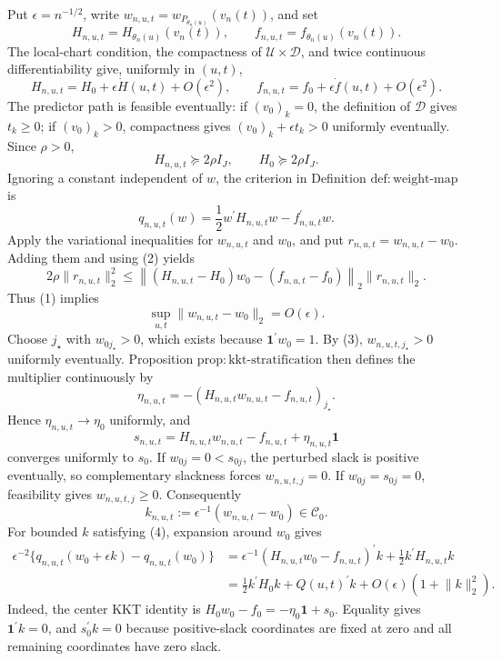 Put \(\epsilon=n^{-1/2}\), write \(w_{n,u,t}=w_{P_{\theta_n(u)}}(v_n(t))\), and set
\[
 H_{n,u,t}=H_{\theta_n(u)}(v_n(t)),\qquad
 f_{n,u,t}=f_{\theta_n(u)}(v_n(t)).
\]
The local-chart condition, the compactness of \(\mathcal U\times\mathcal D\), and twice continuous differentiability give, uniformly in \((u,t)\),
\[
 H_{n,u,t}=H_0+\epsilon\dot H(u,t)+O(\epsilon^2),
 \qquad
 f_{n,u,t}=f_0+\epsilon\dot f(u,t)+O(\epsilon^2).
\tag{1}
\]
The predictor path is feasible eventually: if \((v_0)_k=0\), the definition of \(\mathcal D\) gives \(t_k\geq0\); if \((v_0)_k>0\), compactness gives \((v_0)_k+\epsilon t_k>0\) uniformly eventually.  Since \(\rho>0\),
\[
 H_{n,u,t}\succeq 2\rho I_J,\qquad H_0\succeq2\rho I_J.
\tag{2}
\]
Ignoring a constant independent of \(w\), the criterion in Definition \(\mathrm{def:weight\mbox{-}map}\) is
\[
 q_{n,u,t}(w)=\frac12w^\prime H_{n,u,t}w-f_{n,u,t}^\prime w.
\]
Apply the variational inequalities for \(w_{n,u,t}\) and \(w_0\), and put \(r_{n,u,t}=w_{n,u,t}-w_0\).  Adding them and using (2) yields
\[
 2\rho\lVert r_{n,u,t}\rVert_2^2
 \leq
 \left\lVert (H_{n,u,t}-H_0)w_0-(f_{n,u,t}-f_0)\right\rVert_2
 \lVert r_{n,u,t}\rVert_2.
\]
Thus (1) implies
\[
 \sup_{u,t}\lVert w_{n,u,t}-w_0\rVert_2=O(\epsilon).
\tag{3}
\]
Choose \(j_\star\) with \(w_{0j_\star}>0\), which exists because \(\mathbf1^\prime w_0=1\).  By (3), \(w_{n,u,t,j_\star}>0\) uniformly eventually.  Proposition \(\mathrm{prop:kkt\mbox{-}stratification}\) then defines the multiplier continuously by
\[
 \eta_{n,u,t}=-(H_{n,u,t}w_{n,u,t}-f_{n,u,t})_{j_\star}.
\]
Hence \(\eta_{n,u,t}\to\eta_0\) uniformly, and
\[
 s_{n,u,t}=H_{n,u,t}w_{n,u,t}-f_{n,u,t}+\eta_{n,u,t}\mathbf1
\]
converges uniformly to \(s_0\).  If \(w_{0j}=0<s_{0j}\), the perturbed slack is positive eventually, so complementary slackness forces \(w_{n,u,t,j}=0\).  If \(w_{0j}=s_{0j}=0\), feasibility gives \(w_{n,u,t,j}\geq0\).  Consequently
\[
 k_{n,u,t}:=\epsilon^{-1}(w_{n,u,t}-w_0)\in\mathcal C_0.
\tag{4}
\]
For bounded \(k\) satisfying (4), expansion around \(w_0\) gives
\[
\begin{aligned}
 \epsilon^{-2}\{q_{n,u,t}(w_0+\epsilon k)-q_{n,u,t}(w_0)\}
 &=
 \epsilon^{-1}(H_{n,u,t}w_0-f_{n,u,t})^\prime k
 +\frac12k^\prime H_{n,u,t}k\\
 &=
 \frac12k^\prime H_0k+Q(u,t)^\prime k
 +O(\epsilon)(1+\lVert k\rVert_2^2).
\end{aligned}
\tag{5}
\]
Indeed, the center KKT identity is \(H_0w_0-f_0=-\eta_0\mathbf1+s_0\).  Equality gives \(\mathbf1^\prime k=0\), and \(s_0^\prime k=0\) because positive-slack coordinates are fixed at zero and all remaining coordinates have zero slack.

